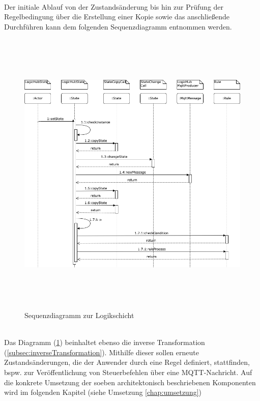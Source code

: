     \\
    Der initiale Ablauf von der Zustandsänderung bis hin zur Prüfung der Regelbedingung über die Erstellung einer Kopie sowie das anschließende Durchführen kann dem folgenden Sequenzdiagramm entnommen werden. 
    \\
    \pagebreak
    \begin{figure}[hbt!]
        \centering
        \includegraphics[width=14cm,height=14cm,keepaspectratio]{images/Logikschicht_Sequenz_final.png}
        \caption{Sequenzdiagramm zur Logikschicht}
        \label{fig:logiksequenz}
    \end{figure}
    \\
    Das Diagramm (\ref{fig:logiksequenz}) beinhaltet ebenso die inverse Transformation (\ref{subsec:inverseTransformation}). Mithilfe dieser sollen erneute 
    Zustandsänderungen, die der Anwender durch eine Regel definiert, stattfinden, bspw. zur Veröffentlichung von Steuerbefehlen über eine \acs{MQTT}-Nachricht. %
    Auf die konkrete Umsetzung der soeben architektonisch beschriebenen Komponenten wird im folgenden Kapitel (siehe Umsetzung \ref{chap:umsetzung}) 
